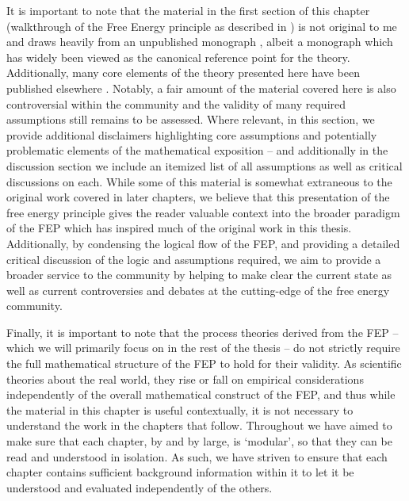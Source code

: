 It is important to note that the material in the first section of this chapter (walkthrough of the Free Energy principle as described in \citet{friston2019particularphysics}) is not original to me and draws heavily from an unpublished monograph \citep{friston2019particularphysics}, albeit a monograph which has widely been viewed as the canonical reference point for the theory. Additionally, many core elements of the theory presented here have been published elsewhere \citep{friston2013life, friston2020some,parr2020markov,friston2020sentience}. Notably, a fair amount of the material covered here is also controversial within the community and the validity of many required assumptions still remains to be assessed. Where relevant, in this section, we provide additional disclaimers highlighting core assumptions and potentially problematic elements of the mathematical exposition -- and additionally in the discussion section we include an itemized list of all assumptions as well as critical discussions on each. While some of this material is somewhat extraneous to the original work covered in later chapters, we believe that this presentation of the free energy principle gives the reader valuable context into the broader paradigm of the FEP which has inspired much of the original work in this thesis. Additionally, by condensing the logical flow of the FEP, and providing a detailed critical discussion of the logic and assumptions required, we aim to provide a broader service to the community by helping to make clear the current state as well as current controversies and debates at the cutting-edge of the free energy community.

Finally, it is important to note that the process theories derived from the FEP -- which we will primarily focus on in the rest of the thesis -- do not strictly require the full mathematical structure of the FEP to hold for their validity. As scientific theories about the real world, they rise or fall on empirical considerations independently of the overall mathematical construct of the FEP, and thus while the material in this chapter is useful contextually, it is not necessary to understand the work in the chapters that follow. Throughout we have aimed to make sure that each chapter, by and by large, is `modular', so that they can be read and understood in isolation. As such, we have striven to ensure that each chapter contains sufficient background information within it to let it be understood and evaluated independently of the others.


